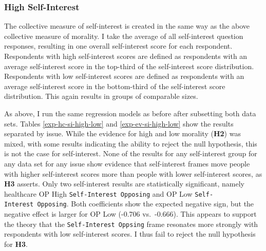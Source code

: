 \documentclass[12pt,econ]{sources/authesis}
\begin{document}
\dsp

\normalsize

\hypertarget{framing-results-experiment-si-high}{%
\subsubsection{High Self-Interest}\label{framing-results-experiment-si-high}}

The collective measure of self-interest is created in the same way as the above collective measure of morality. I take the average of all self-interest question responses, resulting in one overall self-interest score for each respondent. Respondents with high self-interest scores are defined as respondents with an average self-interest score in the top-third of the self-interest score distribution. Respondents with low self-interest scores are defined as respondents with an average self-interest score in the bottom-third of the self-interest score distribution. This again results in groups of comparable sizes.

As above, I run the same regression models as before after subsetting both data sets. Tables \ref{exp-hc-si-high-low} and \ref{exp-ev-si-high-low} show the results separated by issue. While the evidence for high and low morality (\textbf{H2}) was mixed, with some results indicating the ability to reject the null hypothesis, this is not the case for self-interest. None of the results for any self-interest group for any data set for any issue show evidence that self-interest frames move people with higher self-interest scores more than people with lower self-interest scores, as \textbf{H3} asserts. Only two self-interest results are statistically significant, namely healthcare OP High \texttt{Self-Interest\ Opposing} and OP Low \texttt{Self-Interest\ Opposing}. Both coefficients show the expected negative sign, but the negative effect is larger for OP Low (-0.706 vs.~-0.666). This appears to support the theory that the \texttt{Self-Interest\ Oppsing} frame resonates more strongly with respondents with low self-interest scores. I thus fail to reject the null hypothesis for \textbf{H3}.

\ssp

\footnotesize
\end{document}
